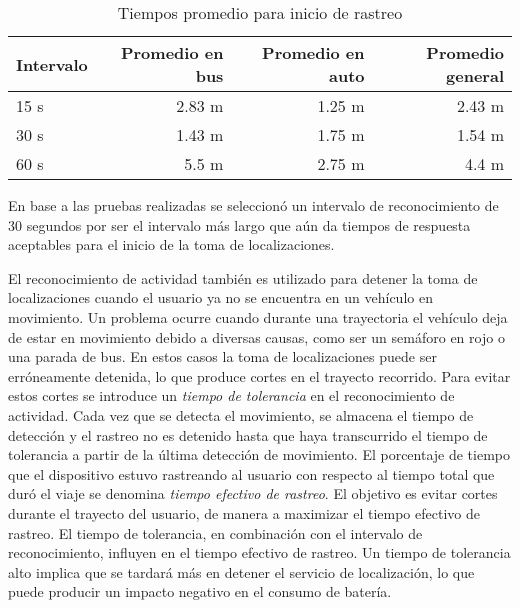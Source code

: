 \begin{table}[h]
  \centering
	\begin{tabular}{lrrr}
	\toprule
	Intervalo & Promedio en bus & Promedio en auto & Promedio general \\
	\midrule
	15 s      & 2.83 m          & 1.25 m           & 2.43 m           \\
	30 s      & 1.43 m          & 1.75 m           & 1.54 m           \\
	60 s      & 5.5 m           & 2.75 m           & 4.4 m            \\
	\bottomrule
	\end{tabular}
  \caption{Tiempos promedio para inicio de rastreo}
  \label{tab:prom_intervalo_reconocimiento}
\end{table}

En base a las pruebas realizadas se seleccionó un intervalo de reconocimiento de 30 segundos por ser el intervalo más largo que aún da tiempos de respuesta aceptables para el inicio de la toma de localizaciones.

El reconocimiento de actividad también es utilizado para detener la toma de localizaciones cuando el usuario ya no se encuentra en un vehículo en movimiento. Un problema ocurre cuando durante una trayectoria el vehículo deja de estar en movimiento debido a diversas causas, como ser un semáforo en rojo o una parada de bus. En estos casos la toma de localizaciones puede ser erróneamente detenida, lo que produce cortes en el trayecto recorrido. Para evitar estos cortes se introduce un \emph{tiempo de tolerancia} en el reconocimiento de actividad. Cada vez que se detecta el movimiento, se almacena el tiempo de detección y el rastreo no es detenido hasta que haya transcurrido el tiempo de tolerancia a partir de la última detección de movimiento. El porcentaje de tiempo que el dispositivo estuvo rastreando al usuario con respecto al tiempo total que duró el viaje se denomina \emph{tiempo efectivo de rastreo}. El objetivo es evitar cortes durante el trayecto del usuario, de manera a maximizar el tiempo efectivo de rastreo. El tiempo de tolerancia, en combinación con el intervalo de reconocimiento, influyen en el tiempo efectivo de rastreo. Un tiempo de tolerancia alto implica que se tardará más en detener el servicio de localización, lo que puede producir un impacto negativo en el consumo de batería.

